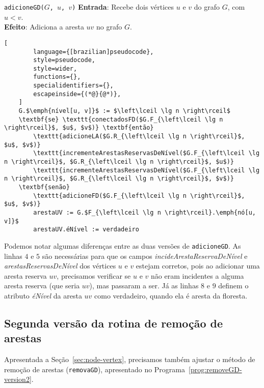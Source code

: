 \begin{programruledcaption}{\texttt{adicioneGD($G$, $u$, $v$)} \label{prog:addGD-version2}}
    \noindent\textbf{Entrada}: Recebe dois vértices $u$ e $v$ do grafo $G$, com $u < v$. \\
    \textbf{Efeito}: Adiciona a aresta $uv$ no grafo $G$.
    \vspace{-0.5\baselineskip}
    \begin{lstlisting}[
        language={[brazilian]pseudocode},
        style=pseudocode,
        style=wider,
        functions={},
        specialidentifiers={},
        escapeinside={(*@}{@*)},
    ]
    G.$\emph{nível[u, v]}$ := $\left\lceil \lg n \right\rceil$
    \textbf{se} \texttt{conectadosFD($G.F_{\left\lceil \lg n \right\rceil}$, $u$, $v$)} \textbf{então}
        \texttt{adicioneLA($G.R_{\left\lceil \lg n \right\rceil}$, $u$, $v$)}
        \texttt{incrementeArestasReservasDeNível($G.F_{\left\lceil \lg n \right\rceil}$, $G.R_{\left\lceil \lg n \right\rceil}$, $u$)}
        \texttt{incrementeArestasReservasDeNível($G.F_{\left\lceil \lg n \right\rceil}$, $G.R_{\left\lceil \lg n \right\rceil}$, $v$)}
    \textbf{senão}
        \texttt{adicioneFD($G.F_{\left\lceil \lg n \right\rceil}$, $u$, $v$)}
        arestaUV := G.$F_{\left\lceil \lg n \right\rceil}.\emph{nó[u, v]}$
        arestaUV.éNível := verdadeiro
    \end{lstlisting}
    \vspace{-0.5\baselineskip}
\end{programruledcaption}

Podemos notar algumas diferenças entre as duas versões de \texttt{adicioneGD}. As linhas $4$ e $5$ são necessárias para que os campos \textit {incideArestaReservaDeNível} e \textit{arestasReservasDeNível} dos vértices $u$ e $v$ estejam corretos, pois ao adicionar uma aresta reserva $uv$, precisamos verificar se $u$ e $v$ não eram incidentes a alguma aresta reserva (que seria $uv$), mas passaram a ser. Já as linhas $8$ e $9$ definem o atributo \textit{éNível} da aresta $uv$ como verdadeiro, quando ela é aresta da floresta. 

\subsection{Segunda versão da rotina de remoção de arestas}
\label{sec:code-edge-removal-second-version}

Apresentada a Seção~\ref{sec:node-vertex}, precisamos também ajustar o método de remoção de arestas (\texttt{removaGD}), apresentado no Programa~\ref{prog:removeGD-version2}. 

